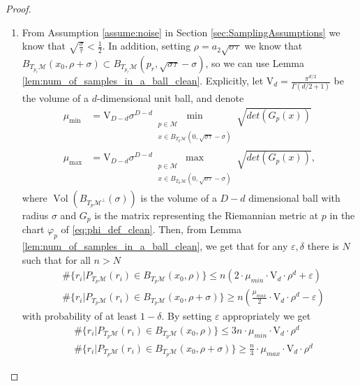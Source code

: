 \documentclass[12pt]{article}
\theoremstyle{remark}
\newcommand{\MM}{\mathcal{M}}
\newcommand{\eps}{\varepsilon}
\newcommand{\lrangle}[1]{\langle #1 \rangle}
\DeclareMathOperator{\vol}{Vol}
\begin{document}
\begin{proof}
\begin{enumerate}
    \begin{equation}\label{eq:ri_tyk_bound_clean}
        \lrangle{r_i - {p_r}, \tilde y_j}^2 \geq \frac{1}{64}\sigma \tau sin\alpha - \frac{1}{2}\sigma^{3/2}\tau^{1/2}
    .\end{equation}
    \item\label{thm:claim_useStochasticLemma} From Assumption \ref{assume:noise} in Section \ref{sec:SamplingAssumptions} we know that $ \sqrt{\frac{\sigma}{\tau}} < \frac{1}{2} $. 
    In addition, setting $ \rho = a_2 \sqrt{\sigma \tau} $ we know that $ B_{T_{p_r}\MM}(x_0, \rho+\sigma)\subset B_{T_{p_r}\MM}({p_r}, \sqrt{\sigma \tau} - \sigma) $, so we can use Lemma \ref{lem:num_of_samples_in_a_ball_clean}.
    Explicitly, let $\mathrm{V}_d = \frac{\pi^{d/2}}{\Gamma(d/2+1)}$ be the volume of a $ d $-dimensional unit ball, and denote 
     \begin{align*}
    \mu_{\min} &= \mathrm{V}_{D-d}\sigma^{D-d} \min_{\substack{p\in \MM\\ x\in B_{T_p\MM}(0,\sqrt{\sigma\tau}- \sigma)}}  \sqrt{det(G_p(x))}\\
    \mu_{\max} &= \mathrm{V}_{D-d}\sigma^{D-d}\max_{\substack{p\in \MM \\ x \in B_{T_p\MM}(0,\sqrt{\sigma\tau}- \sigma)}}  \sqrt{det(G_p(x))}
    ,
    \end{align*}
    where $ \vol(B_{{T_p\MM}^\perp}(\sigma)) $ is the volume of a $ D-d $ dimensional ball with radius $ \sigma $ and $ G_p $ is the matrix representing the Riemannian metric at $ p $ in the chart $ \varphi_p $ of \eqref{eq:phi_def_clean}.
    Then, from Lemma \ref{lem:num_of_samples_in_a_ball_clean}, we get that for any $ \eps, \delta $ there is $ N $ such that for all $ n > N $
    \begin{align*}
    &\#\{r_i|P_{T_p\MM}(r_i) \in B_{T_p\MM}(x_0,\rho) \}
    \leq
    n(2\cdot \mu_{min}\cdot \mathrm{V}_d \cdot\rho^d+\eps) \\
    &\#\{r_i|P_{T_p\MM}(r_i) \in B_{T_p\MM}(x_0,\rho+\sigma) \}
    \geq
    n \left(\frac{\mu_{max}}{2}\cdot \mathrm{V}_{d}\cdot \rho^d - \eps\right)
    \end{align*}
    with probability of at least $1-\delta$.
    By setting $ \eps $ appropriately we get 
    \begin{align*}
    &\#\{r_i|P_{T_p\MM}(r_i) \in B_{T_p\MM}(x_0,\rho) \}
    \leq
    3 n \cdot\mu_{min}\cdot \mathrm{V}_d \cdot\rho^d \\
    &\#\{r_i|P_{T_p\MM}(r_i) \in B_{T_p\MM}(x_0,\rho+\sigma) \}
    \geq
    \frac{n}{3}  \cdot\mu_{max}\cdot \mathrm{V}_{d} \cdot \rho^d 

\end{align*}
\end{enumerate}
\end{proof}
\end{document}
